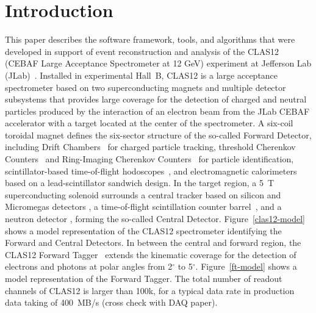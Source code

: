 \section{Introduction}

This paper describes the software framework, tools, and algorithms that were developed in support of event
reconstruction and analysis of the CLAS12 (CEBAF Large Acceptance Spectrometer at 12 GeV) experiment at
Jefferson Lab (JLab)~\cite{clas12-nim}. Installed in experimental Hall~B, CLAS12 is a large acceptance
spectrometer based on two superconducting magnets and multiple detector subsystems that provides large
coverage for the detection of charged and neutral particles produced by the interaction of an electron beam
from the JLab CEBAF accelerator with a target located at the center of the spectrometer. A six-coil toroidal
magnet defines the six-sector structure of the so-called Forward Detector, including Drift Chambers~\cite{dc-nim}
for charged particle tracking, threshold Cherenkov Counters~\cite{ltcc-nim,htcc-nim} and Ring-Imaging Cherenkov
Counters~\cite{rich-nim} for particle identification, scintillator-based time-of-flight hodoscopes~\cite{ftof-nim},
and electromagnetic calorimeters~\cite{ecal-nim} based on a lead-scintillator sandwich design. In the target region,
a 5~T superconducting solenoid surrounds a central tracker based on silicon and Micromegas detectors
\cite{svt-nim,mm-nim}, a time-of-flight scintillation counter barrel~\cite{ctof-nim}, and a neutron detector
\cite{cnd-nim}, forming the so-called Central Detector. Figure~\ref{clas12-model} shows a model representation of
the CLAS12 spectrometer identifying the Forward and Central Detectors. In between the central and forward region,
the CLAS12 Forward Tagger~\cite{ft-nim} extends the kinematic coverage for the detection of electrons and photons
at polar angles from 2$^\circ$ to 5$^\circ$. Figure~\ref{ft-model} shows a model representation of the Forward
Tagger. The total number of readout channels of CLAS12 is larger than 100k, for a typical data rate in production
data taking of 400~MB/s (cross check with DAQ paper).  

